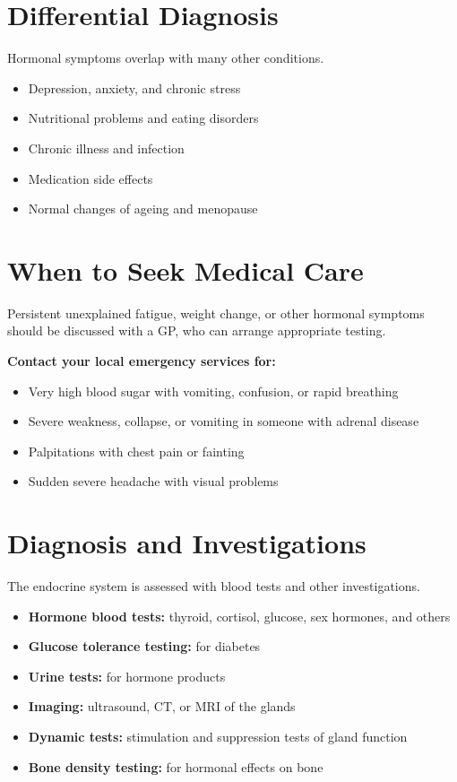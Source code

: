 \section*{Differential Diagnosis}
Hormonal symptoms overlap with many other conditions.
\begin{itemize}
    \item Depression, anxiety, and chronic stress
    \item Nutritional problems and eating disorders
    \item Chronic illness and infection
    \item Medication side effects
    \item Normal changes of ageing and menopause
\end{itemize}

\section*{When to Seek Medical Care}
Persistent unexplained fatigue, weight change, or other hormonal symptoms should be discussed with a GP, who can arrange appropriate testing.

\textbf{Contact your local emergency services for:}
\begin{itemize}
    \item Very high blood sugar with vomiting, confusion, or rapid breathing
    \item Severe weakness, collapse, or vomiting in someone with adrenal disease
    \item Palpitations with chest pain or fainting
    \item Sudden severe headache with visual problems
\end{itemize}

\section*{Diagnosis and Investigations}
The endocrine system is assessed with blood tests and other investigations.
\begin{itemize}
    \item \textbf{Hormone blood tests:} thyroid, cortisol, glucose, sex hormones, and others
    \item \textbf{Glucose tolerance testing:} for diabetes
    \item \textbf{Urine tests:} for hormone products
    \item \textbf{Imaging:} ultrasound, CT, or MRI of the glands
    \item \textbf{Dynamic tests:} stimulation and suppression tests of gland function
    \item \textbf{Bone density testing:} for hormonal effects on bone
\end{itemize}

